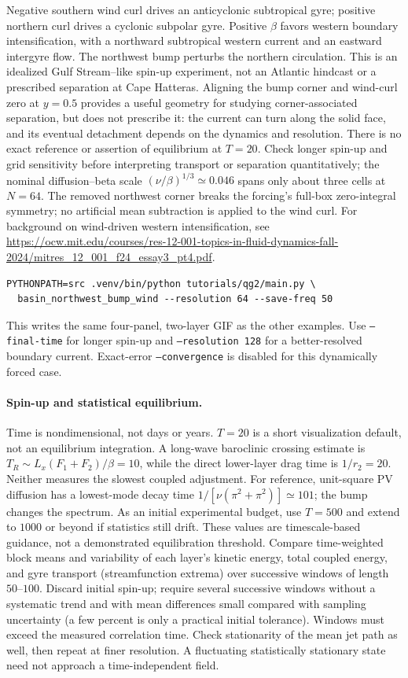 \documentclass[11pt]{article}
\begin{document}
Negative southern wind curl drives an anticyclonic subtropical gyre;
positive northern curl drives a cyclonic subpolar gyre. Positive $\beta$
favors western boundary intensification, with a northward subtropical
western current and an eastward intergyre flow. The northwest bump
perturbs the northern circulation. This is an idealized Gulf Stream--like
spin-up experiment, not an Atlantic hindcast or a prescribed separation
at Cape Hatteras. Aligning the bump corner and wind-curl zero at $y=0.5$
provides a useful geometry for studying corner-associated separation,
but does not prescribe it: the current can turn along the solid face,
and its eventual detachment depends on the dynamics and resolution.
There is no exact reference or assertion of equilibrium at $T=20$.
Check longer spin-up and grid sensitivity before interpreting transport
or separation quantitatively; the nominal diffusion--beta scale
$(\nu/\beta)^{1/3}\simeq0.046$ spans only about three cells at $N=64$.
The removed northwest corner breaks the forcing's full-box zero-integral
symmetry; no artificial mean subtraction is applied to the wind curl.
For background on wind-driven western intensification, see
\url{https://ocw.mit.edu/courses/res-12-001-topics-in-fluid-dynamics-fall-2024/mitres_12_001_f24_essay3_pt4.pdf}.

\begin{verbatim}
PYTHONPATH=src .venv/bin/python tutorials/qg2/main.py \
  basin_northwest_bump_wind --resolution 64 --save-freq 50
\end{verbatim}
This writes the same four-panel, two-layer GIF as the other examples.
Use \texttt{--final-time} for longer spin-up and \texttt{--resolution 128}
for a better-resolved boundary current. Exact-error \texttt{--convergence}
is disabled for this dynamically forced case.

\paragraph{Spin-up and statistical equilibrium.}
Time is nondimensional, not days or years. $T=20$ is a short visualization
default, not an equilibrium integration. A long-wave baroclinic crossing
estimate is $T_R\sim L_x(F_1+F_2)/\beta=10$, while the direct lower-layer
drag time is $1/r_2=20$. Neither measures the slowest coupled adjustment.
For reference, unit-square PV diffusion has a lowest-mode decay time
$1/[\nu(\pi^2+\pi^2)]\simeq101$; the bump changes the spectrum.
As an initial experimental budget, use $T=500$ and extend to $1000$ or
beyond if statistics still drift. These values are timescale-based
guidance, not a demonstrated equilibration threshold.
Compare time-weighted block means and variability of each layer's kinetic
energy, total coupled energy, and gyre transport (streamfunction extrema)
over successive windows of length $50$--$100$. Discard initial spin-up;
require several successive windows without a systematic trend and with
mean differences small compared with sampling uncertainty (a few percent
is only a practical initial tolerance). Windows must exceed the measured
correlation time. Check stationarity of the mean jet path as well, then
repeat at finer resolution. A fluctuating statistically stationary state
need not approach a time-independent field.
\end{document}
